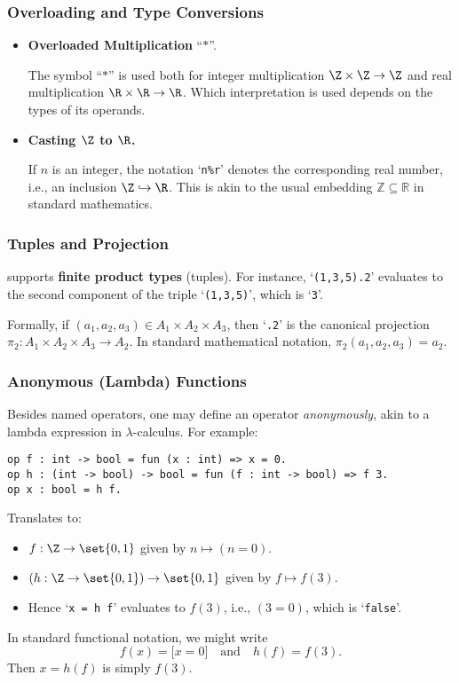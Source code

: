 \newpage
\subsubsection{Overloading and Type Conversions}
\begin{itemize}
	\item \textbf{Overloaded Multiplication} ``\(*\)''.
	
	The symbol ``\(*\)'' is used both for integer multiplication \(\Z\times\Z\to\Z\) and real multiplication \(\R\times\R\to\R\). Which interpretation is used depends on the types of its operands.
	\item \textbf{Casting \(\Z\) to \(\R\).}
	
	If \(n\) is an integer, the notation `\texttt{n\%r}' denotes the corresponding real number, i.e., an inclusion \(\Z\hookrightarrow \R\). This is akin to the usual embedding \(\mathbb{Z}\subseteq \mathbb{R}\) in standard mathematics.
\end{itemize}
\vfill
\subsubsection{Tuples and Projection}
\EasyCrypt supports \textbf{finite product types} (tuples). For instance, `\texttt{(1,3,5).2}' evaluates to the second component of the triple `\texttt{(1,3,5)}', which is `\texttt{3}'.

Formally, if \((a_1,a_2,a_3)\in A_1\times A_2\times A_3\), then `\texttt{.2}' is the canonical projection \(\pi_2 : A_1\times A_2\times A_3 \to A_2\). In standard mathematical notation, \(\pi_2(a_1,a_2,a_3) = a_2\).

\vfill
\subsubsection{Anonymous (Lambda) Functions}
Besides named operators, one may define an operator \textit{anonymously}, akin to a lambda expression in \(\lambda\)-calculus. For example:\\
\begin{lstlisting}[style=easycrypt]
op f : int -> bool = fun (x : int) => x = 0.
op h : (int -> bool) -> bool = fun (f : int -> bool) => f 3.
op x : bool = h f.
\end{lstlisting}
Translates to:
\begin{itemize}
	\item \(f : \Z\to\set{0,1}\) given by \(n \mapsto (n=0)\).  
	\item \((h : \Z\to\set{0,1})\to\set{0,1}\) given by \(f\mapsto f(3)\).  
	\item Hence `\texttt{x = h f}' evaluates to \(f(3)\), i.e., \((3=0)\), which is `\texttt{false}'.
\end{itemize}
In standard functional notation, we might write \[
f(x) = \bigl[x=0\bigr]
\quad
\text{and}
\quad
h(f) = f(3).
\]
Then \(x = h(f)\) is simply \(f(3)\).

